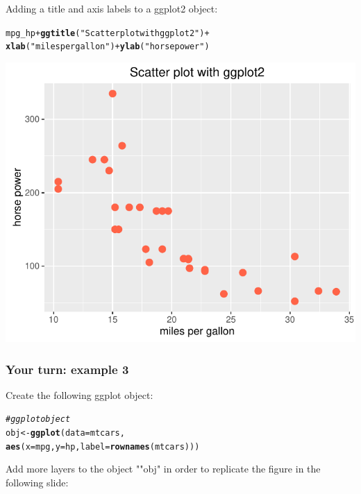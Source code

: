 \documentclass[12pt]{beamer}\usepackage[]{graphicx}\usepackage[]{color}
\makeatletter
\newcommand{\hlstr}[1]{\textcolor[rgb]{0.192,0.494,0.8}{#1}}%
\newcommand{\hlcom}[1]{\textcolor[rgb]{0.678,0.584,0.686}{\textit{#1}}}%
\newcommand{\hlopt}[1]{\textcolor[rgb]{0,0,0}{#1}}%
\newcommand{\hlstd}[1]{\textcolor[rgb]{0.345,0.345,0.345}{#1}}%
\newcommand{\hlkwb}[1]{\textcolor[rgb]{0.69,0.353,0.396}{#1}}%
\newcommand{\hlkwc}[1]{\textcolor[rgb]{0.333,0.667,0.333}{#1}}%
\newcommand{\hlkwd}[1]{\textcolor[rgb]{0.737,0.353,0.396}{\textbf{#1}}}%
\newenvironment{kframe}{%
 \def\at@end@of@kframe{}%
 \ifinner\ifhmode%
  \def\at@end@of@kframe{\end{minipage}}%
  \begin{minipage}{\columnwidth}%
 \fi\fi%
 \def\FrameCommand##1{\hskip\@totalleftmargin \hskip-\fboxsep
 \colorbox{shadecolor}{##1}\hskip-\fboxsep
     \hskip-\linewidth \hskip-\@totalleftmargin \hskip\columnwidth}%
 \MakeFramed {\advance\hsize-\width
   \@totalleftmargin\z@ \linewidth\hsize
   \@setminipage}}%
 {\par\unskip\endMakeFramed%
 \at@end@of@kframe}
\newenvironment{knitrout}{}{} %
\makeatother
\begin{document}
\begin{frame}[fragile]
\frametitle{}
Adding a title and axis labels to a ggplot2 object:
\begin{knitrout}\scriptsize
{}\color{fgcolor}\begin{kframe}
\begin{alltt}
\hlstd{mpg_hp} \hlopt{+} \hlkwd{ggtitle}\hlstd{(}\hlstr{"Scatter plot with ggplot2"}\hlstd{)} \hlopt{+}
  \hlkwd{xlab}\hlstd{(}\hlstr{"miles per gallon"}\hlstd{)} \hlopt{+} \hlkwd{ylab}\hlstd{(}\hlstr{"horse power"}\hlstd{)}
\end{alltt}
\end{kframe}

{\centering \includegraphics[width=.6\linewidth,height=.5\linewidth]{figure/xyplot_mtcars8-1} 

}



\end{knitrout}

\end{frame}


\begin{frame}[fragile]
\frametitle{Your turn: example 3}
Create the following ggplot object:
\begin{knitrout}\footnotesize
{}\color{fgcolor}\begin{kframe}
\begin{alltt}
\hlcom{# ggplot object}
\hlstd{obj} \hlkwb{<-} \hlkwd{ggplot}\hlstd{(}\hlkwc{data} \hlstd{= mtcars,}
         \hlkwd{aes}\hlstd{(}\hlkwc{x} \hlstd{= mpg,} \hlkwc{y} \hlstd{= hp,} \hlkwc{label} \hlstd{=} \hlkwd{rownames}\hlstd{(mtcars)))}
\end{alltt}
\end{kframe}
\end{knitrout}

Add more layers to the object \code"{"obj"} in order to replicate the figure in the following slide:
\end{frame}
\end{document}

